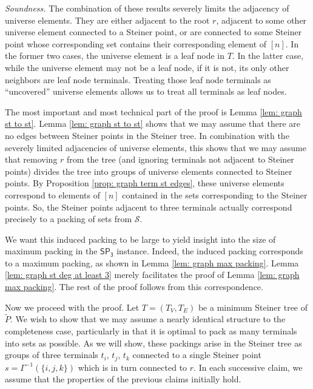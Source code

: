 \documentclass{theoretics}
\newcommand{\1}{\textbf{1}}
\newcommand{\setpT}{$\mathsf{SP_3}$\xspace}
\renewcommand{\tilde}{\widetilde}
\begin{document}
\begin{paragraph}{\textit{Soundness.}}
The combination of these results severely limits the adjacency of universe elements. They are either adjacent to the root $r$, adjacent to some other universe element connected to a Steiner point, or are connected to some Steiner point whose corresponding set contains their corresponding element of $[n]$. In the former two cases, the universe element is a leaf node in $T$. In the latter case, while the universe element may not be a leaf node, if it is not, its only other neighbors are leaf node terminals. Treating those leaf node terminals as ``uncovered'' universe elements allows us to treat all terminals as leaf nodes.

The most important and most technical part of the proof is Lemma \ref{lem: graph st to st}. Lemma \ref{lem: graph st to st} shows that we may assume that there are no edges between Steiner points in the Steiner tree. In combination with the severely limited adjacencies of universe elements, this shows that we may assume that removing $r$ from the tree (and ignoring terminals not adjacent to Steiner points) divides the tree into groups of universe elements connected to Steiner points. By Proposition \ref{prop: graph term st edges}, these universe elements correspond to elements of $[n]$ contained in the sets corresponding to the Steiner points. So, the Steiner points adjacent to three terminals actually correspond precisely to a packing of sets from $\mathcal{S}$.

We want this induced packing to be large to yield insight into the size of maximum packing in the \setpT instance. Indeed, the induced packing corresponds to a maximum packing, as shown in Lemma \ref{lem: graph max packing}. Lemma \ref{lem: graph st deg at least 3} merely facilitates the proof of Lemma \ref{lem: graph max packing}. The rest of the proof follows from this correspondence.

 Now we proceed with the proof. Let $T = (T_V, T_E)$ be a minimum Steiner tree of $\tilde{P}$.  We wish to show that we may assume a nearly identical structure to the completeness case, particularly in that it is optimal to pack as many terminals into sets as possible. As we will show, these packings arise in the Steiner tree as groups of three terminals $t_i$, $t_j$, $t_k$ connected to a single Steiner point $s = \Gamma^{-1}(\{i,j,k\})$ which is in turn connected to $r$. In each successive claim, we assume that the properties of the previous claims initially hold.


\end{paragraph}
\end{document}
